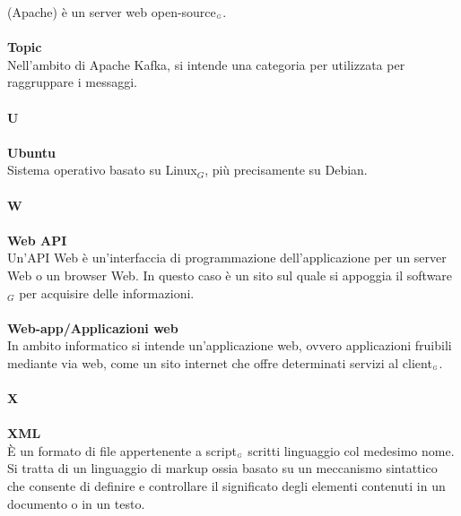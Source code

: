 (Apache) è un server web open-source$_{\scaleto{G}{3pt}}$.\\
\\
\textbf{Topic}\\
Nell'ambito di Apache Kafka, si intende una categoria per utilizzata per raggruppare i messaggi.\\
\\
\textbf{U}\\
\\
\textbf{Ubuntu}\\
Sistema operativo basato su Linux$_G$, più precisamente su Debian.\\
\\
\textbf{W}\\
\\
\textbf{Web API}\\
Un'API Web è un'interfaccia di programmazione dell'applicazione per un server Web o un browser Web.
In questo caso è un sito sul quale si appoggia il software$_G$ per acquisire delle informazioni.\\
\\
\textbf{Web-app/Applicazioni web}\\
In ambito informatico si intende un'applicazione web, ovvero applicazioni fruibili mediante via web, come un sito internet che offre determinati servizi al client$_{\scaleto{G}{3pt}}$.\\
\\
\textbf{X}\\
\\
\textbf{XML}\\
È un formato di file appertenente a script$_{\scaleto{G}{3pt}}$ scritti linguaggio col medesimo nome.
Si tratta di un linguaggio di markup ossia basato su un meccanismo sintattico che consente di definire e controllare il significato degli elementi contenuti in un documento o in un testo.\\
\\
